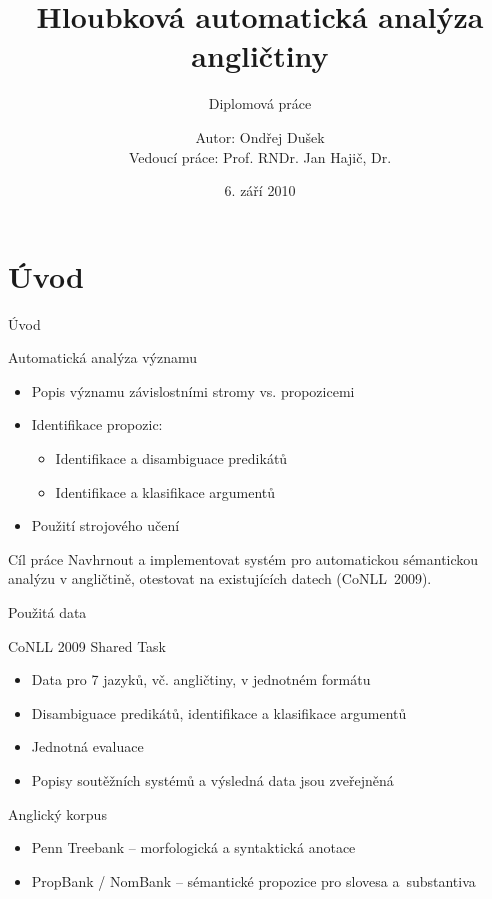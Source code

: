 \documentclass[hyperref={unicode=true}]{beamer}
\title{Hloubková automatická analýza angličtiny}
\subtitle{Diplomová práce}
\author[Ondřej Dušek]{Autor: Ondřej Dušek\\ Vedoucí práce: Prof. RNDr. Jan Hajič, Dr.}
\institute{Ústav formální a aplikované lingvistiky\\ MFF UK}
\date{6. září 2010}
\begin{document}
\begin{frame}
\titlepage
\end{frame}

\section{Úvod}

\begin{frame}{Úvod}

    \begin{block}{Automatická analýza významu}
    \begin{itemize}
        \item Popis významu závislostními stromy vs. propozicemi
        \item Identifikace propozic: 
        \begin{itemize}
            \item Identifikace a disambiguace predikátů
            \item Identifikace a klasifikace argumentů  
        \end{itemize}
        \item Použití strojového učení 
    \end{itemize}
    \end{block}    

    \begin{block}{Cíl práce} 
    Navhrnout a implementovat systém pro automatickou sémantickou analýzu v angličtině, otestovat na existujících datech (CoNLL~2009).
    \end{block}     

\end{frame}

\begin{frame}{Použitá data}
    \begin{block}{CoNLL 2009 Shared Task}
    \begin{itemize}
        \item Data pro 7 jazyků, vč. angličtiny, v jednotném formátu
        \item Disambiguace predikátů, identifikace a klasifikace argumentů 
        \item Jednotná evaluace
        \item Popisy soutěžních systémů a výsledná data jsou zveřejněná
    \end{itemize}
    \end{block}
    \begin{block}{Anglický korpus}
    \begin{itemize}
        \item Penn Treebank -- morfologická a syntaktická anotace
        \item PropBank / NomBank -- sémantické propozice pro slovesa a~substantiva   
    \end{itemize}
    \end{block}
\end{frame}
\end{document}
